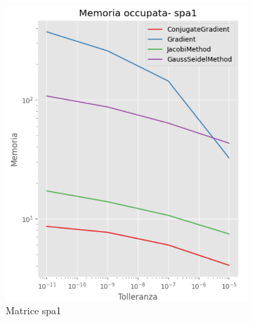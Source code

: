 \begin{figure}[!ht]
    \centering
    \begin{subfigure}{0.45\textwidth}
        \centering
        \includegraphics[width=\textwidth]{./../report/Progetto_1_bis/img/mem_spa1.png}
        \caption{Matrice spa1}
        \label{fig:mem_spa1}
    \end{subfigure}
    \begin{subfigure}{0.45\textwidth}
        \centering

\end{subfigure}
\end{figure}
